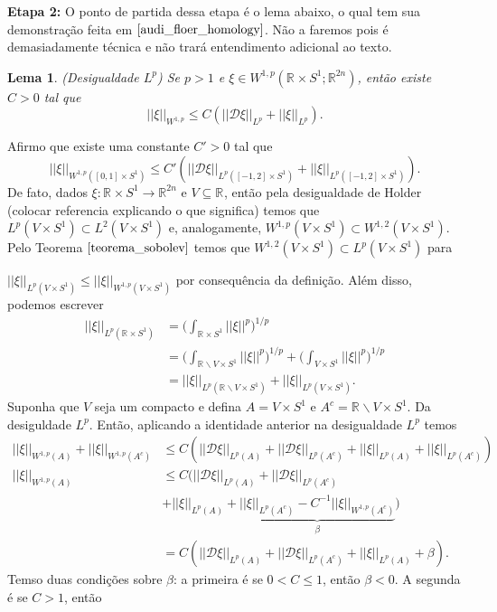 \documentclass[12pt]{book}
\newtheorem{lema}[teorema]{Lema}
\newcommand{\circulo}{S^{1}}
\newcommand{\diferebcialmapafloerabrev}{\mathcal{D}}
\newcommand{\espacoLdois}[1]{L^{2}(#1)}
\newcommand{\espacoLp}[1]{L^{p}(#1)}
\newcommand{\espacosobolev}[1]{W^{1,p}(#1)}
\newcommand{\espacosobolevcontradominio}[2]{W^{1,p}(#1;#2)}
\newcommand{\espacosobolevretacirculo}{\espacosobolevcontradominio{\retacartesianocirculo}{\real{2n}}}
\newcommand{\espacosobolevgeral}[2]{W^{1,#1}(#2)}
\newcommand{\norma}[1]{||#1||}
\newcommand{\normaLp}[1]{||#1||_{L^{p}}}
\newcommand{\normaLpdefinicao}[2]{ \Big(\int_{#2}#1^{p}\Big)^{1/p}}
\newcommand{\normaLpDominio}[2]{||#1||_{L^{p}(#2)}}
\newcommand{\normaWp}[1]{||#1||_{W^{1,p}}}
\newcommand{\normaWpDominio}[2]{||#1||_{W^{1,p}(#2)}}
\newcommand{\retacartesianocirculo}{\real{} \times \circulo}
\newcommand{\real}[1]{\mathbb{R}^{#1}}
\newcommand{\reta}{\real{}}
\newcommand{\vermelho}[1]{{\color{red}#1}}
\begin{document}
	\textbf{Etapa 2:}
	O ponto de partida dessa etapa é o lema abaixo, o qual tem sua demonstração feita em $\cite{audi_floer_homology}$. Não a faremos pois é demasiadamente técnica e não trará entendimento adicional ao texto.
	
	\begin{lema}\label{lema_desigualdade_Lp}
		(Desigualdade $L^{p}$) Se $p>1$ e $\xi \in \espacosobolevretacirculo$, então existe $C>0$ tal que
		$$
		\normaWp{\xi} \leq C(\normaLp{\diferebcialmapafloerabrev \xi}+\normaLp{\xi}).
		$$
	\end{lema}
	
	Afirmo que existe uma constante $C'>0$ tal que
	$$
	\normaWpDominio{\xi}{[0,1]\times \circulo} \leq C'(\normaLpDominio{\diferebcialmapafloerabrev \xi}{[-1,2]\times \circulo}+\normaLpDominio{\xi}{[-1,2]\times \circulo}).
	$$
	De fato, dados $\xi:\retacartesianocirculo\to\real{2n}$ e $V \subseteq \reta$, então pela desigualdade de Holder \vermelho{(colocar referencia explicando o que significa)} temos que $\espacoLp{V\times \circulo} \subset \espacoLdois{V\times \circulo}$ e, analogamente, $\espacosobolev{V\times \circulo} \subset \espacosobolevgeral{2}{V\times \circulo}$. Pelo Teorema $\ref{teorema_sobolev}$ temos que $\espacosobolevgeral{2}{V\times \circulo} \subset \espacoLp{V\times \circulo}$ para 
	
	
	
	
	$\normaLpDominio{\xi}{V\times \circulo} \leq \normaWpDominio{\xi}{V \times \circulo}$ por consequência da definição. Além disso, podemos escrever
	$$
	\begin{aligned}
	\normaLpDominio{\xi}{\retacartesianocirculo} 
	&= \normaLpdefinicao{\norma{\xi}}{\retacartesianocirculo} 
	\\
	&= \normaLpdefinicao{\norma{\xi}}{\reta\backslash V \times \circulo}+\normaLpdefinicao{\norma{\xi}}{V\times \circulo} 
	\\
	&= \normaLpDominio{\xi}{\reta\backslash V \times \circulo} +\normaLpDominio{\xi}{V\times \circulo}.
	\end{aligned}
	$$
	Suponha que $V$ seja um compacto e defina $A = V \times \circulo$ e $A^{c} = \reta\backslash V\times \circulo$. Da desiguldade $L^{p}$. Então, aplicando a identidade anterior na desigualdade $L^{p}$ temos
	$$
	\begin{aligned}
		\normaWpDominio{\xi}{A} + \normaWpDominio{\xi}{A^{c}}
		&\leq C(\normaLpDominio{\diferebcialmapafloerabrev \xi}{A}+\normaLpDominio{\diferebcialmapafloerabrev \xi}{A^{c}}+\normaLpDominio{\xi}{A}+\normaLpDominio{\xi}{A^{c}})
		\\
		\normaWpDominio{\xi}{A} 
		&\leq C(\normaLpDominio{\diferebcialmapafloerabrev \xi}{A}+\normaLpDominio{\diferebcialmapafloerabrev \xi}{A^{c}}
		\\
		&+\normaLpDominio{\xi}{A}+\underbrace{\normaLpDominio{\xi}{A^{c}} -C^{-1}\normaWpDominio{\xi}{A^{c}}}_{\beta})
		\\
		&=C(\normaLpDominio{\diferebcialmapafloerabrev \xi}{A}+\normaLpDominio{\diferebcialmapafloerabrev \xi}{A^{c}}+\normaLpDominio{\xi}{A}+ \beta).
	\end{aligned}
	$$
	Temso duas condições sobre $\beta$: a primeira é se $0<C\leq 1$, então $\beta<0$. A segunda é se $C>1$, então 
	
\end{document}
